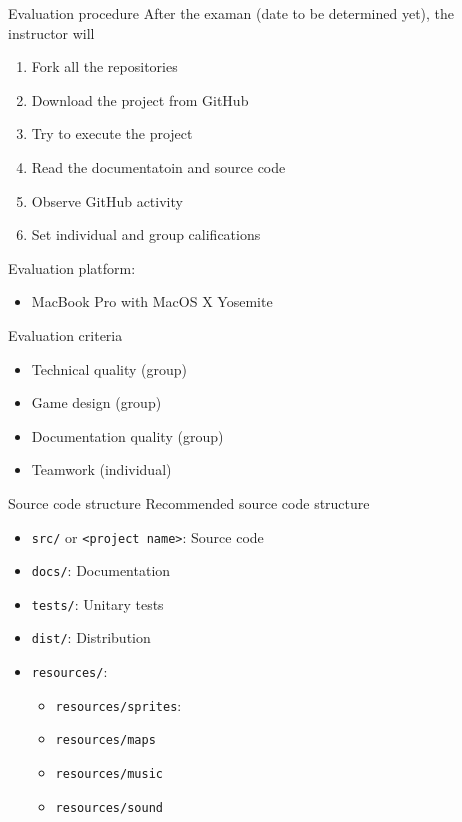 \documentclass[10pt,compress]{beamer} %
\begin{document}
\begin{frame}{Evaluation procedure}
	After the examan (date to be determined yet), the instructor will
	\begin{enumerate}
	\item Fork all the repositories
	\item Download the project from GitHub
	\item Try to execute the project
	\item Read the documentatoin and source code
	\item Observe GitHub activity
	\item Set individual and group califications
	\end{enumerate}

	Evaluation platform:
	\begin{itemize}
	\item MacBook Pro with MacOS X Yosemite
	\end{itemize}
\end{frame}

\begin{frame}{Evaluation criteria}
	\begin{itemize}	
	\item Technical quality (group)
	\item Game design (group)
	\item Documentation quality (group)
	\item Teamwork (individual)
	\end{itemize}
\end{frame}

\begin{frame}{Source code structure}
	Recommended source code structure
	\begin{itemize}
	\item \texttt{src/} or \texttt{<project name>}: Source code
	\item \texttt{docs/}: Documentation
	\item \texttt{tests/}: Unitary tests
	\item \texttt{dist/}: Distribution
	\item \texttt{resources/}:
		\begin{itemize}
		\item \texttt{resources/sprites}:
		\item \texttt{resources/maps}
		\item \texttt{resources/music}
		\item \texttt{resources/sound}
		\end{itemize}
	\end{itemize}
\end{frame}
\end{document}
